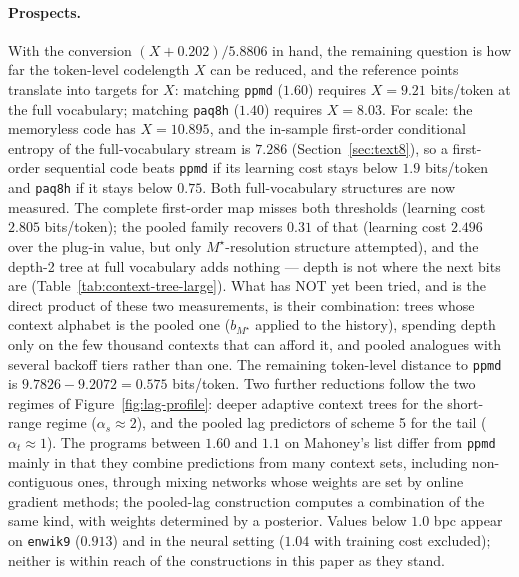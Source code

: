 \documentclass[11pt]{article}
\begin{document}
\paragraph{Prospects.}
With the conversion $(X + 0.202)/5.8806$ in hand, the remaining
question is how far the token-level codelength $X$ can be reduced,
and the reference points translate into targets for $X$: matching
\texttt{ppmd} ($1.60$) requires $X = 9.21$ bits/token at the full
vocabulary; matching \texttt{paq8h} ($1.40$) requires $X = 8.03$.
For scale: the memoryless code has $X = 10.895$, and the in-sample
first-order conditional entropy of the full-vocabulary stream is
$7.286$ (Section~\ref{sec:text8}), so a first-order sequential code
beats \texttt{ppmd} if its learning cost stays below $1.9$ bits/token
and \texttt{paq8h} if it stays below $0.75$.  Both full-vocabulary
structures are now measured.  The complete first-order map misses both
thresholds (learning cost $2.805$ bits/token); the pooled family
recovers $0.31$ of that (learning cost $2.496$ over the plug-in
value, but only $M^\star$-resolution structure attempted), and the
depth-2 tree at full vocabulary adds nothing --- depth is not where
the next bits are (Table~\ref{tab:context-tree-large}).  What has NOT
yet been tried, and is the direct product of these two measurements,
is their combination: trees whose context alphabet is the pooled one
($b_{M^\star}$ applied to the history), spending depth only on the
few thousand contexts that can afford it, and pooled analogues with
several backoff tiers rather than one.  The remaining token-level
distance to \texttt{ppmd} is $9.7826 - 9.2072 = 0.575$ bits/token.  Two further reductions follow the two regimes of
Figure~\ref{fig:lag-profile}: deeper adaptive context trees for the
short-range regime ($\alpha_s \approx 2$), and the pooled lag
predictors of scheme 5 for the tail ($\alpha_t \approx 1$).  The
programs between $1.60$ and $1.1$ on Mahoney's list differ from
\texttt{ppmd} mainly in that they combine predictions from many
context sets, including non-contiguous ones, through mixing networks
whose weights are set by online gradient methods; the pooled-lag
construction computes a combination of the same kind, with weights
determined by a posterior.  Values below $1.0$ bpc appear on
\texttt{enwik9} ($0.913$) and in the neural setting ($1.04$ with
training cost excluded); neither is within reach of the constructions
in this paper as they stand.
\end{document}
